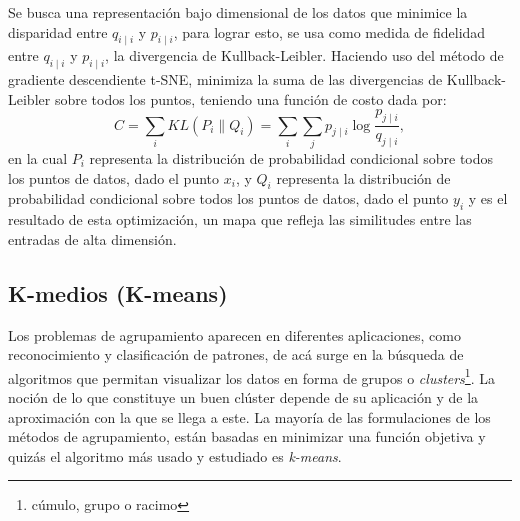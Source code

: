 \documentclass[spanish,11pt,letterpaper,oneside]{memoir}
\begin{document}
	Se busca una representación bajo dimensional de los datos que minimice la disparidad entre $q_{i \mid i}$ y $p_{i \mid i}$, para lograr esto, se usa como medida de fidelidad entre $q_{i \mid i}$ y $p_{i \mid i}$, la divergencia de Kullback-Leibler. Haciendo uso del método de gradiente descendiente t-SNE, minimiza la suma de las divergencias de Kullback-Leibler sobre todos los puntos, teniendo una función de costo dada por: 
	\begin{equation}
		\label{eq:func_costo}
		C = \sum_i KL(P_i\|Q_i)=\sum_i\sum_j p_{j\mid i}\log\frac{p_{j\mid i}}{q_{j\mid i}},
	\end{equation}
	en la cual $P_i$ representa la distribución de probabilidad condicional sobre todos los puntos de datos, dado el punto $x_i$, y $Q_i$ representa la distribución de probabilidad condicional sobre todos los puntos de datos, dado el punto $y_i$ y es el resultado de esta optimización, un mapa que refleja las similitudes entre las entradas de alta dimensión.
	
\subsection{K-medios (K-means)}

	Los problemas de agrupamiento aparecen en diferentes aplicaciones, como reconocimiento y clasificación de patrones, de acá surge en la búsqueda de algoritmos que permitan visualizar los datos en forma de grupos o \textit{clusters}\footnote{cúmulo, grupo o racimo}. La noción de lo que constituye un buen clúster depende de su aplicación y de la aproximación con la que se llega a este. La mayoría de las formulaciones de los métodos de agrupamiento, están basadas en minimizar una función objetiva y quizás el algoritmo más usado y estudiado es \textit{k-means}.
\end{document}
